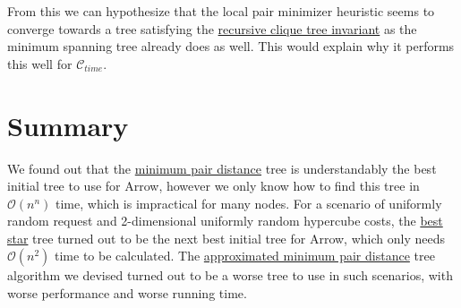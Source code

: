 \documentclass[a4paper, oneside]{discothesis}
\begin{document}
From this we can hypothesize that the local pair minimizer heuristic seems to converge towards a tree satisfying the \hyperref[reclique-invariant]{recursive clique tree invariant} as the minimum spanning tree already does as well. This would explain why it performs this well for $\mathcal{C}_{time}$.

\chapter{Summary}

We found out that the \hyperref[tree:mpd]{minimum pair distance} tree is understandably the best initial tree to use for Arrow, however we only know how to find this tree in $\mathcal{O}(n^n)$ time, which is impractical for many nodes. For a scenario of uniformly random request and 2-dimensional uniformly random hypercube costs, the \hyperref[tree:star]{best star} tree turned out to be the next best initial tree for Arrow, which only needs $\mathcal{O}(n^2)$ time to be calculated. The \hyperref[tree:ampd]{approximated minimum pair distance} tree algorithm we devised turned out to be a worse tree to use in such scenarios, with worse performance and worse running time.
\end{document}
